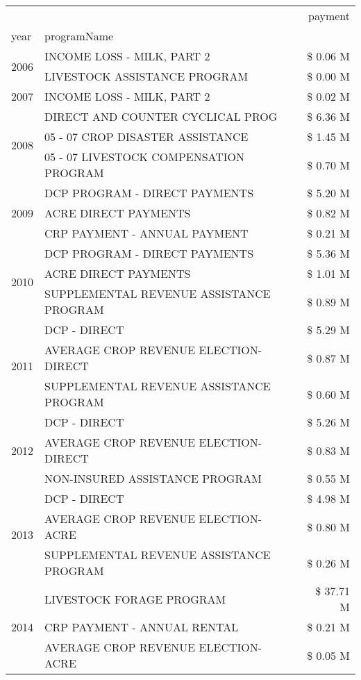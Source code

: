 \begin{tabular}{llr}
\toprule
 &  & payment \\
year & programName &  \\
\midrule
\multirow[t]{2}{*}{2006} & INCOME LOSS - MILK, PART 2 & \$ 0.06 M \\
 & LIVESTOCK ASSISTANCE PROGRAM & \$ 0.00 M \\
\cline{1-3}
2007 & INCOME LOSS - MILK, PART 2 & \$ 0.02 M \\
\cline{1-3}
\multirow[t]{3}{*}{2008} & DIRECT AND COUNTER CYCLICAL PROG & \$ 6.36 M \\
 & 05 - 07 CROP DISASTER ASSISTANCE & \$ 1.45 M \\
 & 05 - 07 LIVESTOCK COMPENSATION PROGRAM & \$ 0.70 M \\
\cline{1-3}
\multirow[t]{3}{*}{2009} & DCP PROGRAM - DIRECT PAYMENTS & \$ 5.20 M \\
 & ACRE DIRECT PAYMENTS & \$ 0.82 M \\
 & CRP PAYMENT - ANNUAL PAYMENT & \$ 0.21 M \\
\cline{1-3}
\multirow[t]{3}{*}{2010} & DCP PROGRAM - DIRECT PAYMENTS & \$ 5.36 M \\
 & ACRE DIRECT PAYMENTS & \$ 1.01 M \\
 & SUPPLEMENTAL REVENUE ASSISTANCE PROGRAM & \$ 0.89 M \\
\cline{1-3}
\multirow[t]{3}{*}{2011} & DCP - DIRECT & \$ 5.29 M \\
 & AVERAGE CROP REVENUE ELECTION-DIRECT & \$ 0.87 M \\
 & SUPPLEMENTAL REVENUE ASSISTANCE PROGRAM & \$ 0.60 M \\
\cline{1-3}
\multirow[t]{3}{*}{2012} & DCP - DIRECT & \$ 5.26 M \\
 & AVERAGE CROP REVENUE ELECTION-DIRECT & \$ 0.83 M \\
 & NON-INSURED ASSISTANCE PROGRAM & \$ 0.55 M \\
\cline{1-3}
\multirow[t]{3}{*}{2013} & DCP - DIRECT & \$ 4.98 M \\
 & AVERAGE CROP REVENUE ELECTION-ACRE & \$ 0.80 M \\
 & SUPPLEMENTAL REVENUE ASSISTANCE PROGRAM & \$ 0.26 M \\
\cline{1-3}
\multirow[t]{3}{*}{2014} & LIVESTOCK FORAGE PROGRAM & \$ 37.71 M \\
 & CRP PAYMENT - ANNUAL RENTAL & \$ 0.21 M \\
 & AVERAGE CROP REVENUE ELECTION-ACRE & \$ 0.05 M \\
\cline{1-3}

\end{tabular}
